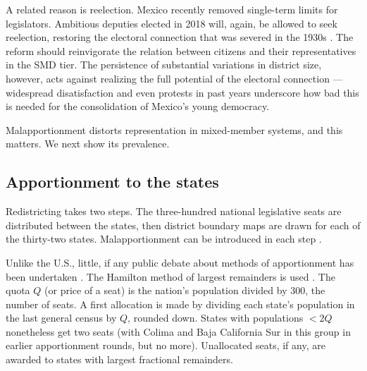 \documentclass[letter,12pt]{article}
\begin{document}
A related reason is reelection. Mexico recently removed single-term limits for legislators. Ambitious deputies elected in 2018 will, again, be allowed to seek reelection, restoring the electoral connection that was severed in the 1930s \citep{dworak.legisladorAexamen.2003}. The reform should reinvigorate the relation between citizens and their representatives in the SMD tier. The persistence of substantial variations in district size, however, acts against realizing the full potential of the electoral connection \citep{mayhew.1974}---widespread disatisfaction and even protests in past years underscore how bad this is needed for the consolidation of Mexico's young democracy. 


Malapportionment distorts representation in mixed-member systems, and this matters. We next show its prevalence. 

\subsection{Apportionment to the states}

Redistricting takes two steps. The three-hundred national legislative seats are distributed between the states, then district boundary maps are drawn for each of the thirty-two states. Malapportionment can be introduced in each step \citep[see][]{snyder.samuelsMalapp2004}. 

Unlike the U.S., little, if any public debate about methods of apportionment has been undertaken \citep{szpiro.numbersRule.2010,balinski.rodriguez.1996}. The Hamilton method of largest remainders is used \citep[][:10]{balinskiYoung2001FairRep}. The quota $Q$ (or price of a seat) is the nation's population divided by 300, the number of seats. A first allocation is made by dividing each state's population in the last general census by $Q$, rounded down. States with populations $<2Q$ nonetheless get two seats (with Colima and Baja California Sur in this group in earlier apportionment rounds, but no more). Unallocated seats, if any, are awarded to states with largest fractional remainders. 
\end{document}
